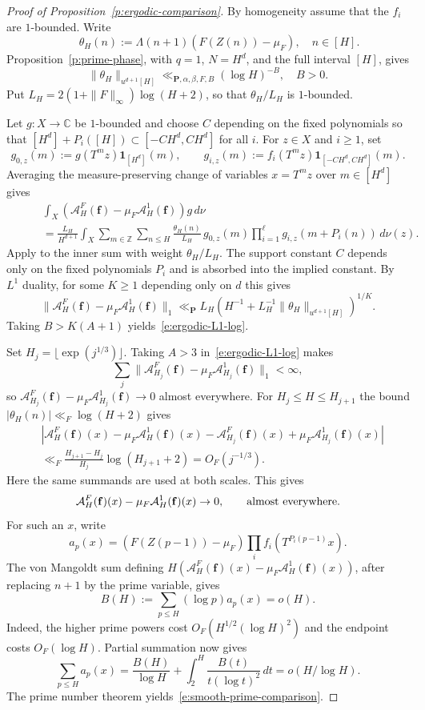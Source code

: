 \documentclass[12pt]{amsart}
\newcommand{\1}{\mathbf 1}
\theoremstyle{definition}
\begin{document}
\begin{proof}[Proof of Proposition~\ref{p:ergodic-comparison}]
By homogeneity assume that the \(f_i\) are \(1\)-bounded. Write
$$  \qquad \theta_H(n):=\Lambda(n+1)(F(Z(n))-\mu_F), \quad n\in [H].$$
Proposition~\ref{p:prime-phase}, with \(q=1\), \(N=H^d\), and
the full interval \([H]\), gives
\[\|\theta_H\|_{u^{d+1}[H]}\ll_{\mathbf P,\alpha,\beta,F,B}(\log H)^{-B}, \quad B>0.\] 
Put
\(L_H=2(1+\|F\|_\infty)\log(H+2)\), so that \(\theta_H/L_H\)
is \(1\)-bounded.

Let \(g:X\to\mathbb C\) be \(1\)-bounded and choose \(C\) depending
on the fixed polynomials so that \([H^d]+P_i([H])\subset[-CH^d,CH^d]\)
for all \(i\). For \(z\in X\) and \(i\ge1\), set
\[g_{0,z}(m):=g(T^m z)\mathbf1_{[H^d]}(m),\qquad g_{i,z}(m):=f_i(T^m z)\mathbf1_{[-CH^d,CH^d]}(m).\] 
Averaging the measure-preserving change of variables \(x=T^m z\) over \(m\in[H^d]\) gives
\begin{align*}
 &\int_X (\mathcal A_H^F(\mathbf f)-\mu_F\mathcal A_H^1(\mathbf f))g\,d\nu\\
 \qquad &=\frac{L_H}{H^{d+1}}\int_X
    \sum_{m\in\mathbb Z}\sum_{n\le H}
       \frac{\theta_H(n)}{L_H}\,
       g_{0,z}(m)\prod_{i=1}^{\ell}g_{i,z}(m+P_i(n))\,d\nu(z).
\end{align*}
Apply \cite[Theorem~4.1]{Teravainen} to the inner sum with weight
$\theta_H/L_H$. The support constant $C$ depends only on the
fixed polynomials $P_i$ and is absorbed into the implied constant.
 By \(L^1\) duality, for some \(K\ge1\) depending
only on \(d\) this gives
\[
 \|\mathcal A_H^F(\mathbf f)-\mu_F\mathcal A_H^1(\mathbf f)\|_1\ll_{\mathbf P}
 L_H\left(H^{-1}+L_H^{-1}\|\theta_H\|_{u^{d+1}[H]}\right)^{1/K}.
\]
Taking \(B>K(A+1)\) yields~\eqref{e:ergodic-L1-log}.

Set \(H_j=\lfloor\exp(j^{1/3})\rfloor\). Taking \(A>3\)
in~\eqref{e:ergodic-L1-log} makes 
\[\sum_j\|\mathcal A_{H_j}^F(\mathbf f)-\mu_F\mathcal A_{H_j}^1(\mathbf f)\|_1 <\infty,\] 
so \(\mathcal A_{H_j}^F(\mathbf f)-\mu_F\mathcal A_{H_j}^1(\mathbf f)\to0\) almost everywhere. For \(H_j\le H\le H_{j+1}\)
the bound \(|\theta_H(n)|\ll_F\log(H+2)\) gives
\begin{align*}
     &|\mathcal A_{H}^F(\mathbf f)(x)-\mu_F\mathcal A_{H}^1(\mathbf f)(x)-\mathcal A_{H_j}^F(\mathbf f)(x)+\mu_F\mathcal A_{H_j}^1(\mathbf f)(x)|\\
 &\ll_F \frac{H_{j+1}-H_j}{H_j}\log(H_{j+1}+2)
 =O_F(j^{-1/3}).
\end{align*}
Here the same summands are used at both scales. This gives
\[\mathcal A_{H}^F(\mathbf f)(x)-\mu_F\mathcal A_{H}^1(\mathbf f)(x)\to0, \qquad \textup{almost everywhere.} \] 
For such an \(x\), write
\[a_p(x)=(F(Z(p-1))-\mu_F)\prod_i f_i(T^{P_i(p-1)}x).\]
The von Mangoldt sum defining \(H(\mathcal A_{H}^F(\mathbf f)(x)-\mu_F\mathcal A_{H}^1(\mathbf f)(x))\), after replacing \(n+1\)
by the prime variable, gives
\[B(H):=\sum_{p\le H}(\log p)a_p(x)=o(H).\] Indeed, the higher
prime powers cost \(O_F(H^{1/2}(\log H)^2)\) and the endpoint
costs \(O_F(\log H)\). Partial summation now gives
\[
 \sum_{p\le H}a_p(x)
 =\frac{B(H)}{\log H}+\int_2^H\frac{B(t)}{t(\log t)^2}\,dt
 =o(H/\log H).
\]
The prime number theorem yields~\eqref{e:smooth-prime-comparison}.
\end{proof}
\end{document}
